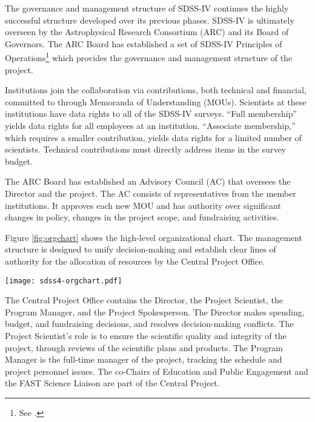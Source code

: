 The governance and management structure of SDSS-IV continues the
highly successful structure developed over its previous phases.
SDSS-IV is ultimately overseen by the Astrophysical Research
Consortium (ARC) and its Board of Governors.  The ARC Board has
established a set of SDSS-IV Principles of
Operations\footnote{See .}
which provides the governance and management structure of the project.

Institutions join the collaboration via contributions, both technical
and financial, committed to through Memoranda of Understanding
(MOUs). Scientists at these institutions have data rights to all of
the SDSS-IV surveys. ``Full membership'' yields data rights for all
employees at an institution. ``Associate membership,'' which requires
a smaller contribution, yields data rights for a limited number of
scientists. Technical contributions must directly address items in the
survey budget.

The ARC Board has established an Advisory Council (AC) that oversees
the Director and the project. The AC consists of representatives from
the member institutions. It approves each new MOU and has authority
over significant changes in policy, changes in the project scope, and
fundraising activities. 

Figure \ref{fig:orgchart} shows the high-level organizational chart.
The management structure is designed to unify decision-making and
establish clear lines of authority for the allocation of resources by
the Central Project Office.

\begin{figure*}[t!]
\centering
\texttt{[image: sdss4-orgchart.pdf]}
\caption{ High-level organizational chart for SDSS-IV, as of 
2017 February. Positions have rotated somewhat during the project and will
continue to do so.}
\label{fig:orgchart}
\end{figure*}

The Central Project Office contains the Director, the Project
Scientist, the Program Manager, and the Project Spokesperson. The
Director makes spending, budget, and fundraising decisions, and
resolves decision-making conflicts.  The Project Scientist's role is
to ensure the scientific quality and integrity of the project, through
reviews of the scientific plans and products.  The Program Manager is
the full-time manager of the project, tracking the schedule and
project personnel issues. The co-Chairs of Education and Public
Engagement and the FAST Science Liaison are part of the Central
Project.

